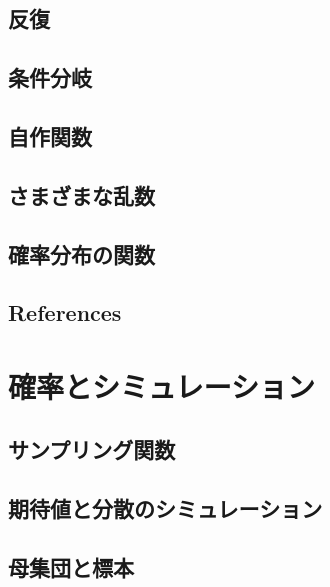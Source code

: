 \documentclass[
  a4paper,
]{ltjsbook}
\begin{document}
\section{反復}\label{ux53cdux5fa9}

\section{条件分岐}\label{ux6761ux4ef6ux5206ux5c90}

\section{自作関数}\label{ux81eaux4f5cux95a2ux6570}

\section{さまざまな乱数}\label{ux3055ux307eux3056ux307eux306aux4e71ux6570}

\section{確率分布の関数}\label{ux78baux7387ux5206ux5e03ux306eux95a2ux6570}

\section{References}\label{references-4}



\chapter{確率とシミュレーション}\label{ux78baux7387ux3068ux30b7ux30dfux30e5ux30ecux30fcux30b7ux30e7ux30f3}

\section{サンプリング関数}\label{ux30b5ux30f3ux30d7ux30eaux30f3ux30b0ux95a2ux6570}

\section{期待値と分散のシミュレーション}\label{ux671fux5f85ux5024ux3068ux5206ux6563ux306eux30b7ux30dfux30e5ux30ecux30fcux30b7ux30e7ux30f3}

\section{母集団と標本}\label{ux6bcdux96c6ux56e3ux3068ux6a19ux672c}
\end{document}

